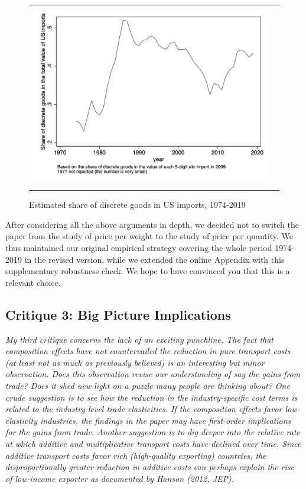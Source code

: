 \documentclass[a4paper,11pt]{article}
\begin{document}
\begin{figure}[htbp]
	\caption{Estimated share of discrete goods in US imports, 1974-2019}
	\begin{center}
		\begin{tabular}{cc}
			\includegraphics[height=8cm]{../../revised_article/Share_of_discrete_goods.png}\\
		\end{tabular}
	\end{center}
	\label{graph_Share_of_discrete_goods.png}%
\end{figure}


After considering all the above arguments in depth, we decided not to switch the paper from the study of price per weight to the study of price per quantity. We thus maintained our original empirical strategy covering the whole period 1974-2019 in the revised version, while we extended the online Appendix with this supplementary robustness check. We hope to have convinced you that this is a relevant choice.

\subsection{Critique 3: Big Picture Implications}

\textit{My third critique concerns the lack of an exciting punchline. The fact that
composition effects have not countervailed the reduction in pure transport costs
(at least not as much as previously believed) is an interesting but minor observation.
Does this observation revise our understanding of say the gains from
trade? Does it shed new light on a puzzle many people are thinking about?
One crude suggestion is to see how the reduction in the industry-specific cost
terms is related to the industry-level trade elasticities. If the composition effects
favor low-elasticity industries, the findings in the paper may have first-order
implications for the gains from trade.
Another suggestion is to dig deeper into the relative rate at which additive
and multiplicative transport costs have declined over time. Since additive transport
costs favor rich (high-quality exporting) countries, the disproportionally
greater reduction in additive costs can perhaps explain the rise of low-income
exporter as documented by Hanson (2012, JEP).}
\end{document}

